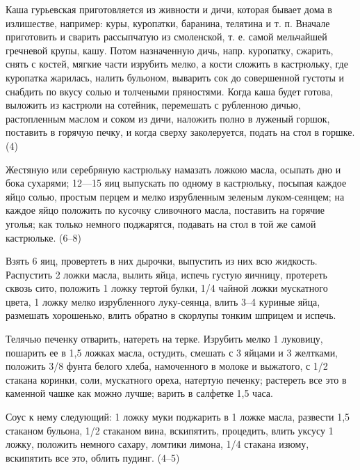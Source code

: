 
Каша гурьевская приготовляется из живности и дичи, которая бывает дома в излишестве, например: куры, куропатки, баранина, телятина и т. п. Вначале приготовить и сварить рассыпчатую из смоленской, т. е. самой мельчайшей гречневой крупы, кашу. Потом назначенную дичь, напр. куропатку, сжарить, снять с костей, мягкие части изрубить мелко, а кости сложить в кастрюльку, где куропатка жарилась, налить бульоном, выварить сок до совершенной густоты и снабдить по вкусу солью и толчеными пряностями. Когда каша будет готова, выложить из кастрюли на сотейник, перемешать с рубленною дичью, растопленным маслом и соком из дичи, наложить полно в луженый горшок, поставить в горячую печку, и когда сверху заколеруется, подать на стол в горшке. (4) 


Жестяную или серебряную кастрюльку намазать ложкою масла, осыпать дно и бока сухарями; 12—15 яиц выпускать по одному в кастрюльку, посыпая каждое яйцо солью, простым перцем и мелко изрубленным зеленым луком-сеянцем; на каждое яйцо положить по кусочку сливочного масла, поставить на горячие уголья; как только немного поджарятся, подавать на стол в той же самой кастрюльке. (6--8) 


Взять 6 яиц, провертеть в них дырочки, выпустить из них всю жидкость. Распустить 2 ложки масла, вылить яйца, испечь густую яичницу, протереть сквозь сито, положить 1 ложку тертой булки, 1/4 чайной ложки мускатного цвета, 1 ложку мелко изрубленного луку-сеянца, влить 3--4 куриные яйца, размешать хорошенько, влить обратно в скорлупы тонким шприцем и испечь. 


Телячью печенку отварить, натереть на терке. Изрубить мелко 1 луковицу, пошарить ее в 1,5 ложках масла, остудить, смешать с 3 яйцами и 3 желтками, положить 3/8 фунта белого хлеба, намоченного в молоке и выжатого, с 1/2 стакана коринки, соли, мускатного ореха, натертую печенку; растереть все это в каменной чашке как можно лучше; варить в салфетке 1,5 часа. 

Соус к нему следующий: 1 ложку муки поджарить в 1 ложке масла, развести 1,5 стаканом бульона, 1/2 стаканом вина, вскипятить, процедить, влить уксусу 1 ложку, положить немного сахару, ломтики лимона, 1/4 стакана изюму, вскипятить все это, облить пудинг. (4--5) 

